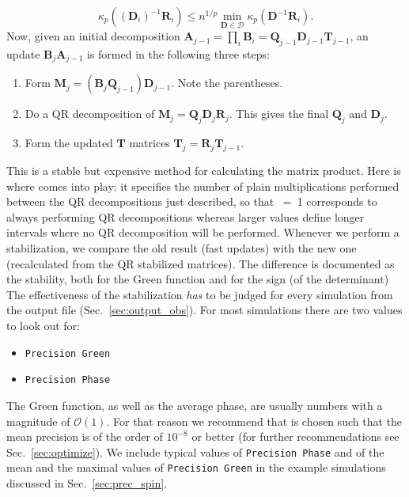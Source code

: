 \begin{equation*}
\kappa_p((\bm{D}_i)^{-1} \bm{R}_i ) \leq n^{1/p} \min_{\bm{D} \in \mathcal{D}} \kappa_p(\bm{D}^{-1} \bm{R}_i).
\end{equation*}
Now, given an initial decomposition $\bm{A}_{j-1} = \prod_i \mathcal{\bm{B}}_i = \bm{Q}_{j-1} \bm{D}_{j-1} \bm{T}_{j-1}$, an update
$\mathcal{\bm{B}}_j \bm{A}_{j-1}$ is formed in the following three steps:
\begin{enumerate}
\item Form $ \bm{M}_j = (\mathcal{\bm{B}}_j \bm{Q}_{j-1}) \bm{D}_{j-1}$. Note the parentheses.
\item Do a QR decomposition of $\bm{M}_j = \bm{Q}_j \bm{D}_j \bm{R}_j$. This gives the final $\bm{Q}_j$ and $\bm{D}_j$.
\item Form the updated $\bm{T}$ matrices $\bm{T}_j = \bm{R}_j \bm{T}_{j-1}$.
\end{enumerate}
This is a stable but expensive method for calculating the matrix product. Here is where  comes into play: it specifies 
the number of plain multiplications performed between the QR decompositions just described, so that ~=~1 corresponds to always performing QR decompositions whereas larger values define longer intervals where no QR decomposition will be performed.
Whenever we perform a stabilization, we compare the old result (fast updates) with the new one (recalculated from the QR stabilized matrices). The difference is documented as the stability, both for the Green function and for the sign (of the determinant)
The effectiveness of the stabilization \emph{has} to be judged for every simulation from the output file  (Sec.~\ref{sec:output_obs}). For most simulations there are two values to look out for:
\begin{itemize}
\item \texttt{Precision Green} 
\item \texttt{Precision Phase} 
\end{itemize}
The Green function, as well as the average phase, are usually numbers with a magnitude of $\mathcal{O} (1)$. 
For that reason we recommend that   is chosen such that the mean precision is of the order of $10^{-8}$ or better (for further recommendations see Sec.~\ref{sec:optimize}).
We include typical values of \texttt{Precision Phase} and of the mean and the maximal values of \texttt{Precision Green} in the example simulations discussed in Sec.~\ref{sec:prec_spin}.
